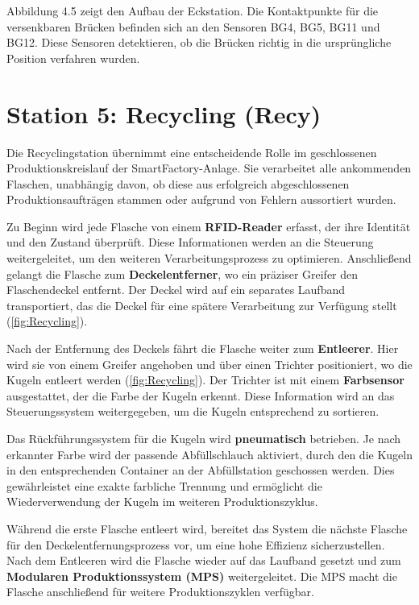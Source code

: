 Abbildung 4.5 zeigt den Aufbau der Eckstation. Die Kontaktpunkte für die versenkbaren Brücken befinden sich an den Sensoren BG4, BG5, BG11 und BG12. 
Diese Sensoren detektieren, ob die Brücken richtig in die ursprüngliche Position verfahren wurden.

\section{Station 5: Recycling (Recy)}\label{sec:Station 6: Recycling}

Die Recyclingstation übernimmt eine entscheidende Rolle im geschlossenen Produktionskreislauf der SmartFactory-Anlage. Sie verarbeitet alle 
ankommenden Flaschen, unabhängig davon, ob diese aus erfolgreich abgeschlossenen Produktionsaufträgen stammen oder aufgrund von Fehlern 
aussortiert wurden.

Zu Beginn wird jede Flasche von einem \textbf{RFID-Reader} erfasst, der ihre Identität und den Zustand überprüft. Diese Informationen werden an 
die Steuerung weitergeleitet, um den weiteren Verarbeitungsprozess zu optimieren. Anschließend gelangt die Flasche zum \textbf{Deckelentferner}, 
wo ein präziser Greifer den Flaschendeckel entfernt. Der Deckel wird auf ein separates Laufband transportiert, das die Deckel für eine spätere 
Verarbeitung zur Verfügung stellt (\ref{fig:Recycling}).

Nach der Entfernung des Deckels fährt die Flasche weiter zum \textbf{Entleerer}. Hier wird sie von einem Greifer angehoben und über einen 
Trichter positioniert, wo die Kugeln entleert werden (\ref{fig:Recycling}). Der Trichter ist mit einem 
\textbf{Farbsensor} ausgestattet, der die Farbe der Kugeln erkennt. Diese Information wird an das Steuerungssystem weitergegeben, um die 
Kugeln entsprechend zu sortieren.

Das Rückführungssystem für die Kugeln wird \textbf{pneumatisch} betrieben. Je nach erkannter Farbe wird der passende Abfüllschlauch 
aktiviert, durch den die Kugeln in den entsprechenden Container an der Abfüllstation geschossen werden. Dies gewährleistet eine exakte 
farbliche Trennung und ermöglicht die Wiederverwendung der Kugeln im weiteren Produktionszyklus.

Während die erste Flasche entleert wird, bereitet das System die nächste Flasche für den Deckelentfernungsprozess vor, um eine hohe Effizienz 
sicherzustellen. Nach dem Entleeren wird die Flasche wieder auf das Laufband gesetzt und zum \textbf{Modularen Produktionssystem (MPS)} 
weitergeleitet. Die MPS macht die Flasche anschließend für weitere Produktionszyklen verfügbar.

